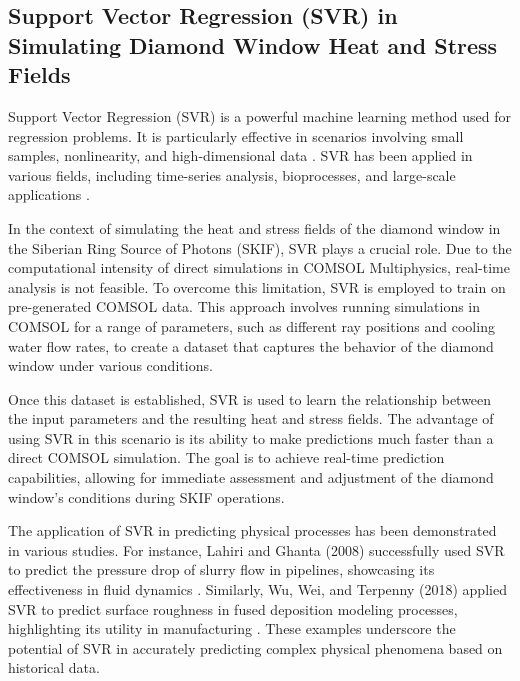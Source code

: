 \subsection{Support Vector Regression (SVR) in Simulating Diamond Window Heat
and Stress Fields}

Support Vector Regression (SVR) is a powerful machine learning method used for
regression problems. It is particularly effective in scenarios involving small
samples, nonlinearity, and high-dimensional data \cite{Guo2009Application}. SVR
has been applied in various fields, including time-series analysis,
bioprocesses, and large-scale applications \cite{Rivas-Perea2013Support}.

In the context of simulating the heat and stress fields of the diamond window
in the Siberian Ring Source of Photons (SKIF), SVR plays a crucial role. Due to
the computational intensity of direct simulations in COMSOL Multiphysics,
real-time analysis is not feasible. To overcome this limitation, SVR is
employed to train on pre-generated COMSOL data. This approach involves running
simulations in COMSOL for a range of parameters, such as different ray
positions and cooling water flow rates, to create a dataset that captures the
behavior of the diamond window under various conditions.

Once this dataset is established, SVR is used to learn the relationship between
the input parameters and the resulting heat and stress fields. The advantage of
using SVR in this scenario is its ability to make predictions much faster than
a direct COMSOL simulation. The goal is to achieve real-time prediction
capabilities, allowing for immediate assessment and adjustment of the diamond
window's conditions during SKIF operations.

The application of SVR in predicting physical processes has been demonstrated
in various studies. For instance, Lahiri and Ghanta (2008) successfully used
SVR to predict the pressure drop of slurry flow in pipelines, showcasing its
effectiveness in fluid dynamics \cite{Lahiri2008Prediction}. Similarly, Wu,
Wei, and Terpenny (2018) applied SVR to predict surface roughness in fused
deposition modeling processes, highlighting its utility in manufacturing
\cite{Wu2018Predictive}. These examples underscore the potential of SVR in
accurately predicting complex physical phenomena based on historical data.
